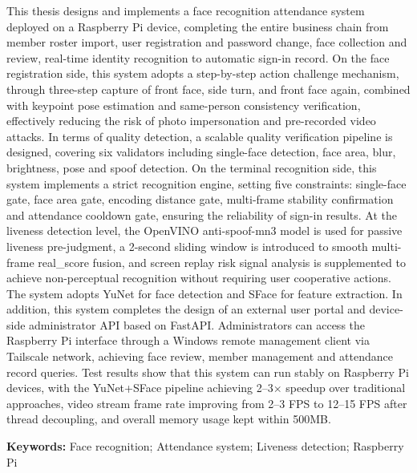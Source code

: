 \documentclass{heuthesis}
\begin{document}
This thesis designs and implements a face recognition attendance system deployed on a Raspberry Pi device, completing the entire business chain from member roster import, user registration and password change, face collection and review, real-time identity recognition to automatic sign-in record. On the face registration side, this system adopts a step-by-step action challenge mechanism, through three-step capture of front face, side turn, and front face again, combined with keypoint pose estimation and same-person consistency verification, effectively reducing the risk of photo impersonation and pre-recorded video attacks. In terms of quality detection, a scalable quality verification pipeline is designed, covering six validators including single-face detection, face area, blur, brightness, pose and spoof detection. On the terminal recognition side, this system implements a strict recognition engine, setting five constraints: single-face gate, face area gate, encoding distance gate, multi-frame stability confirmation and attendance cooldown gate, ensuring the reliability of sign-in results. At the liveness detection level, the OpenVINO anti-spoof-mn3 model is used for passive liveness pre-judgment, a 2-second sliding window is introduced to smooth multi-frame real\_score fusion, and screen replay risk signal analysis is supplemented to achieve non-perceptual recognition without requiring user cooperative actions. The system adopts YuNet for face detection and SFace for feature extraction. In addition, this system completes the design of an external user portal and device-side administrator API based on FastAPI. Administrators can access the Raspberry Pi interface through a Windows remote management client via Tailscale network, achieving face review, member management and attendance record queries. Test results show that this system can run stably on Raspberry Pi devices, with the YuNet+SFace pipeline achieving 2--3$\times$ speedup over traditional approaches, video stream frame rate improving from 2--3 FPS to 12--15 FPS after thread decoupling, and overall memory usage kept within 500MB.

\medskip
\noindent\textbf{Keywords:} Face recognition; Attendance system; Liveness detection; Raspberry Pi

\tableofcontents
\clearpage







\end{document}
